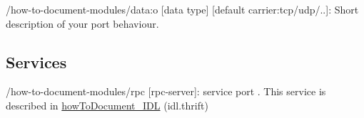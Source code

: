 \begin{DoxyItemize}
\item /how-\/to-\/document-\/modules/data\+:o \mbox{[}data type\mbox{]} \mbox{[}default carrier\+:tcp/udp/..\mbox{]}\+: Short description of your port behaviour.
\end{DoxyItemize}\hypertarget{group__how-to-document-modules_services_sec}{}\subsection{Services}\label{group__how-to-document-modules_services_sec}

\begin{DoxyItemize}
\item /how-\/to-\/document-\/modules/rpc \mbox{[}rpc-\/server\mbox{]}\+: service port . This service is described in \hyperlink{classhowToDocument__IDL}{how\+To\+Document\+\_\+\+I\+DL} (idl.\+thrift) 
\end{DoxyItemize}